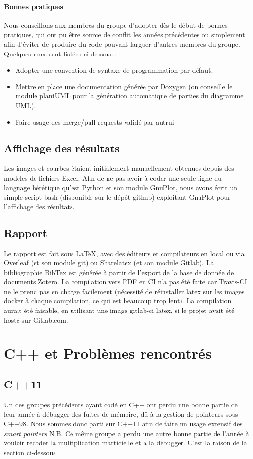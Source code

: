 \paragraph{Bonnes pratiques}
Nous conseillons aux membres du groupe d'adopter dès le début de bonnes pratiques, qui ont pu être source de conflit les années précédentes ou simplement afin d'éviter de produire du code pouvant larguer d'autres membres du groupe. Quelques unes sont listées ci-dessous :
\begin{itemize}
\item Adopter une convention de syntaxe de programmation par défaut.
\item Mettre en place une documentation générée par Doxygen (on conseille le module plantUML pour la génération automatique de parties du diagramme UML). 
\item Faire usage des merge/pull requests validé par autrui
\end{itemize}

\subsection{Affichage des résultats}
Les images et courbes étaient initialement manuellement obtenues depuis des modèles de fichiers Excel.
Afin de ne pas avoir à coder une seule ligne du language hérétique qu'est Python et son module GnuPlot, nous avons écrit un simple script bash (disponible sur le dépôt github) exploitant GnuPlot pour l'affichage des résultats. 

\subsection{Rapport}
Le rapport est fait sous LaTeX, avec des éditeurs et compilateurs en local ou via Overleaf (et son module git) ou Sharelatex (et son module Gitlab). La bibliographie BibTex est générée à partir de l'export de la base de donnée de documents Zotero. La compilation vers PDF en CI n'a pas été faite car Travis-CI ne le prend pas en charge facilement (nécessité de réinstaller latex sur les images docker à chaque compilation, ce qui est beaucoup trop lent). La compilation aurait été faisable, en utilisant une image gitlab-ci latex, si le projet avait été hosté sur Gitlab.com.

\section{C++ et Problèmes rencontrés}
\subsection{C++11}
Un des groupes précédents \cite{amosse_pinapl_2017} ayant codé en C++ ont perdu une bonne partie de leur année à débugger des fuites de mémoire, dû à la gestion de pointeurs sous C++98. Nous sommes donc parti sur C++11 afin de faire un usage extensif des \textit{smart pointers}
N.B. Ce même groupe a perdu une autre bonne partie de l'année à vouloir recoder la multiplication marticielle et à la débugger. C'est la raison de la section ci-dessous 


